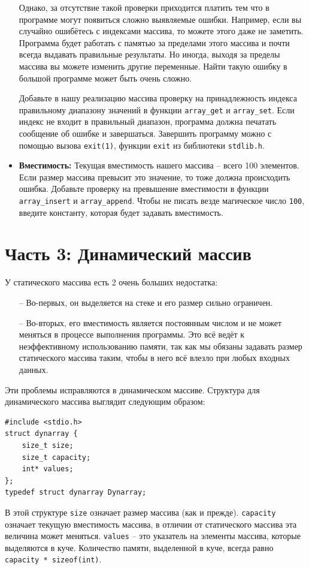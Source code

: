 \documentclass{article}
\begin{document}
\begin{itemize}
Однако, за отсутствие такой проверки приходится платить тем что в программе могут появиться сложно выявляемые ошибки. Например, если вы случайно ошибётесь с индексами массива, то можете этого даже не заметить. Программа будет работать с памятью за пределами этого массива и почти всегда выдавать правильные результаты. Но иногда, выходя за пределы массива вы можете изменить другие переменные. Найти такую ошибку в большой программе может быть очень сложно.

Добавьте в нашу реализацию массива проверку на принадлежность индекса правильному диапазону значений в функции \texttt{array\_get} и \texttt{array\_set}. Если индекс не входит в правильный диапазон, программа должна печатать сообщение об ошибке и завершаться. Завершить программу можно с помощью вызова \texttt{exit(1)}, функции \texttt{exit} из библиотеки \texttt{stdlib.h}. 

\item \textbf{Вместимость:} Текущая вместимость нашего массива -- всего 100 элементов. Если размер массива превысит это значение, то тоже должна происходить ошибка. Добавьте проверку на превышение вместимости в функции \texttt{array\_insert} и \texttt{array\_append}. Чтобы не писать везде магическое число \texttt{100}, введите константу, которая будет задавать вместимость.

\end{itemize}

\newpage
\section*{Часть 3: Динамический массив}
У статического массива есть 2 очень больших недостатка:
\begin{itemize}
\item[--] Во-первых, он выделяется на стеке и его размер сильно ограничен.
\item[--] Во-вторых, его вместимость является постоянным числом и не может меняться в процессе выполнения программы. Это всё ведёт к неэффективному использованию памяти, так как мы обязаны задавать размер статического массива таким, чтобы в него всё влезло при любых входных данных.
\end{itemize}

Эти проблемы исправляются в динамическом массиве. Структура для динамического массива выглядит следующим образом:
\begin{lstlisting}
#include <stdio.h>
struct dynarray {
    size_t size;
    size_t capacity;
    int* values;
};
typedef struct dynarray Dynarray;
\end{lstlisting}
В этой структуре \texttt{size} означает размер массива (как и прежде). \texttt{capacity} означает текущую вместимость массива, в отличии от статического массива эта величина может меняться. \texttt{values} -- это указатель на элементы массива, которые выделяются в куче. Количество памяти, выделенной в куче, всегда равно \texttt{capacity * sizeof(int)}.\\
\end{document}
